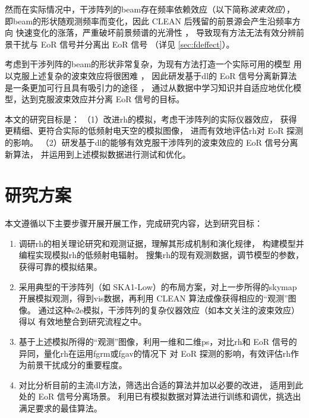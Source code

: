 \begin{itemize}
\hspace{2\ccwd}%
然而在实际情况中，干涉阵列的\ac{beam}存在频率依赖效应（以下简称\emph{波束效应}），
即\acl{beam}的形状随观测频率而变化，因此 CLEAN 后残留的前景源会产生沿频率方向
快速变化的涨落，严重破坏前景频谱的光滑性 \cite{liu2009ps}，
导致现有方法无法有效分辨前景干扰与 EoR 信号并分离出 EoR 信号
（详见 \autoref{sec:fdeffect}）。

\hspace{2\ccwd}%
考虑到干涉列阵的\acl{beam}的形状非常复杂，为现有方法打造一个实际可用的模型
用以克服上述复杂的波束效应将很困难 \cite{lochner2015}，
因此研发基于\ac{dl}的 EoR 信号分离新算法是一条更加可行且具有吸引力的途径
\cite{herbel2018,vafaeiSadr2018}，
通过从数据中学习知识并自适应地优化模型，达到克服波束效应并分离 EoR 信号的目标。

\end{itemize}

本文的研究目标是：
（1）改进\acl{rh}的模拟，考虑干涉阵列的实际仪器效应，
获得更精细、更符合实际的低频射电天空的模拟图像，
进而有效地评估\acl{rh}对 EoR 探测的影响。
（2）研发基于\acl{dl}的能够有效克服干涉阵列的波束效应的 EoR 信号分离新算法，
并运用到上述模拟数据进行测试和优化。


\section{研究方案}
\label{sec:plan}

本文遵循以下主要步骤开展开展工作，完成研究内容，达到研究目标：
\begin{enumerate}
\item
调研\acl{rh}的相关理论研究和观测证据，理解其形成机制和演化规律，
构建模型并编程实现模拟\acl{rh}的低频射电辐射。
搜集\acl{rh}的现有观测数据，调节模型的参数，获得可靠的模拟结果。

\item
采用典型的干涉阵列（如 SKA1-Low）的布局方案，对上一步所得的\ac{skymap}
开展模拟观测，得到\ac{vis}数据，再利用 CLEAN 算法成像获得相应的“观测”图像。
通过这种\ac{e2e}模拟，干涉阵列的复杂仪器效应（如本文关注的波束效应）得以
有效地整合到研究流程之中。

\item
基于上述模拟所得的“观测”图像，利用一维和二维\ac{ps}，对比\acl{rh}和
EoR 信号的异同，量化\acl{rh}在运用\acl{fgrm}或\acl{fgav}的情况下
对 EoR 探测的影响，有效评估\acl{rh}作为前景干扰成分的重要程度。

\item
对比分析目前的主流\acl{dl}方法，筛选出合适的算法并加以必要的改进，
适用到此处的 EoR 信号分离场景。
利用已有模拟数据对算法进行训练和调优，挑选出满足要求的最佳算法。

\end{enumerate}


